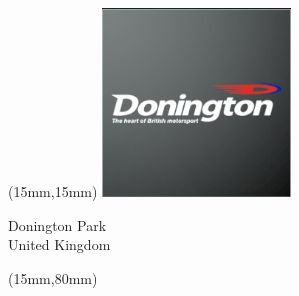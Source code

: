 \begin{textblock*}{50mm}(15mm,15mm)%
\includegraphics[width=50mm]{LG/2015-05-20_00080.png}
\par Donington Park\\ United Kingdom
\end{textblock*}
\begin{textblock*}{185mm}(15mm,80mm)%
\end{textblock*}
